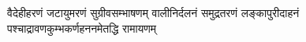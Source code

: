 
{वैदेहीहरणं जटायुमरणं सुग्रीवसम्भाषणम्}
{वालीनिर्दलनं समुद्रतरणं लङ्कापुरीदाहनं}
{पश्चाद्रावणकुम्भकर्णहननमेतद्धि रामायणम्}